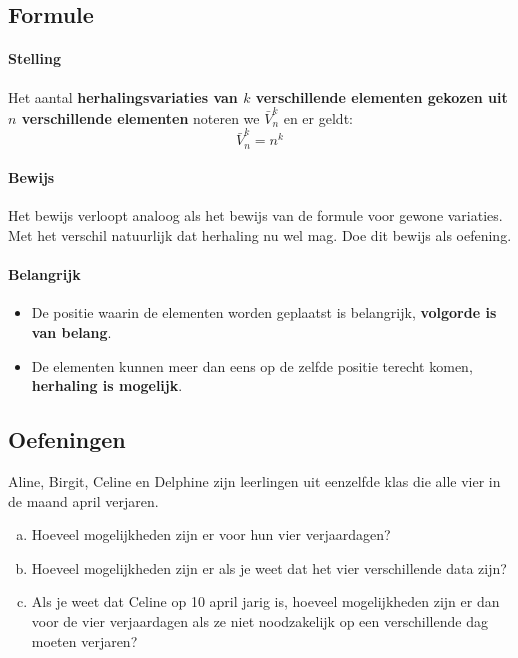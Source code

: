 \documentclass[12pt,a4paper,twoside]{article}
\begin{document}
\subsection{Formule}

\paragraph*{Stelling}
\begin{mdframed}
Het aantal {\bf herhalingsvariaties van $k$ verschillende elementen gekozen uit $n$ verschillende elementen} noteren we $\bar{V}^k_n$ en er geldt:
$$\bar{V}^k_n=n^k$$
\end{mdframed}

\paragraph*{Bewijs} Het bewijs verloopt analoog als het bewijs van de formule voor gewone variaties. Met het verschil natuurlijk dat herhaling nu wel mag. Doe dit bewijs als oefening.

\paragraph*{Belangrijk}
\begin{itemize}
  \item De positie waarin de elementen worden geplaatst is belangrijk, {\bf volgorde is van belang}.
  \item De elementen kunnen meer dan eens op de zelfde positie terecht komen, {\bf herhaling is mogelijk}.
\end{itemize}

\subsection{Oefeningen}

\begin{oefening}
Aline, Birgit, Celine en Delphine zijn leerlingen uit eenzelfde klas die alle vier in de maand april verjaren.
\begin{enumerate}[(a)]
  \item Hoeveel mogelijkheden zijn er voor hun vier verjaardagen?
  \item Hoeveel mogelijkheden zijn er als je weet dat het vier verschillende data zijn?
  \item Als je weet dat Celine op 10 april jarig is, hoeveel mogelijkheden zijn er dan voor de vier verjaardagen als ze niet noodzakelijk op een verschillende dag moeten verjaren?
\end{enumerate}
\end{oefening}
\end{document}

